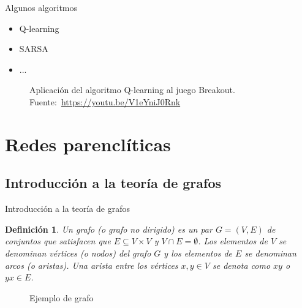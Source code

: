 \documentclass[hyperref={unicode}]{beamer}
\newtheorem{defi}{\textbf{\color{ExecusharesBlue}Definición}}
\begin{document}
\begin{frame}{Algunos algoritmos}
	\begin{minipage}{0.3\textwidth}
		\begin{itemize}
			\item Q-learning
			\item SARSA
			\item ...
		\end{itemize}
	\end{minipage}
	\hfill
	\begin{minipage}{0.65\textwidth}
		\begin{figure}[htbp!]
			\centering
			\caption{Aplicación del algoritmo Q-learning al juego Breakout. Fuente:~\url{https://youtu.be/V1eYniJ0Rnk}}
		\end{figure}
	\end{minipage}
\end{frame}

\section{Redes parenclíticas}
\subsection{Introducción a la teoría de grafos}
\begin{frame}{Introducción a la teoría de grafos}
	\begin{defi}
		Un grafo (o grafo no dirigido) es un par $G = (V,E)$ de conjuntos que satisfacen que $E \subseteq V\times V$ y $V \cap E = \emptyset$. Los elementos de $V$ se denominan vértices (o nodos) del grafo $G$ y los elementos de $E$ se denominan arcos (o aristas). Una arista entre los vértices $x, y \in V$ se denota como $xy$ o $yx \in E$.
	\end{defi}
	
	\begin{figure}[htb]
		\centering
		\resizebox{0.25\textheight}{!}{\ejemplografo}
		\caption{Ejemplo de grafo}
		\label{fig:grafo}
	\end{figure}
\end{frame}
\end{document}
